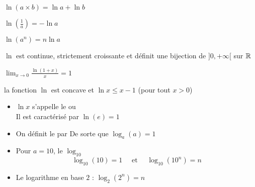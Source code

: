 \begin{frame}
\begin{proposition}
\begin{enumerate}
  \item $\ln (a \times b) = \ln a + \ln b$
 {  \item  $\ln(\frac 1 a) = - \ln a$}
 {  \item $\ln(a^n) = n \ln a$}
 {   \item $\ln$ est continue, strictement croissante et définit une bijection de
$]0,+\infty[$ sur $\mathbb{R}$ }
 {  \item $\lim_{x\to0}\frac{\ln(1+x)}{x} = 1$}
 {  \item la fonction $\ln$ est concave et $\ln x \le x-1$ (pour tout $x>0$)}
\end{enumerate}
\end{proposition} 


\end{frame}


\begin{frame}

\begin{itemize}
  \item $\ln x$ s'appelle le  ou  \\
\pause
  Il est caractérisé par $\ln(e)=1$
\pause  
  \item On définit le  par 
\pause  
De sorte que $\log_a(a)=1$
\pause  
  \item Pour $a=10$, le  $\log_{10}$ 
$$\log_{10} (10)=1 \quad \text{ et } \quad  \log_{10}(10^n)=n$$
\pause  
\vspace*{-3ex}
\pause    
  \item Le logarithme en base $2$ : $\log_2(2^n)=n$
  
\end{itemize}

\end{frame}

